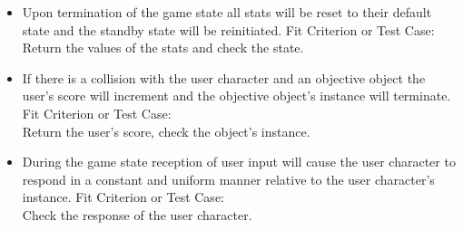 \documentclass[11pt, oneside]{article}   	%
\begin{document}
\begin{itemize}
\item
Upon termination of the game state all stats will be reset to their default state and the standby state will be reinitiated.
\subitem
Fit Criterion or Test Case: \\
Return the values of the stats and check the state.

\item
If there is a collision with the user character and an objective object the user's score will increment and the objective object's instance will terminate.
\subitem
Fit Criterion or Test Case: \\
Return the user's score, check the object's instance.

\item
During the game state reception of user input will cause the user character to respond in a constant and uniform manner relative to the user character's instance.
\subitem
Fit Criterion or Test Case: \\
Check the response of the user character.

\end{itemize}
\end{document}
